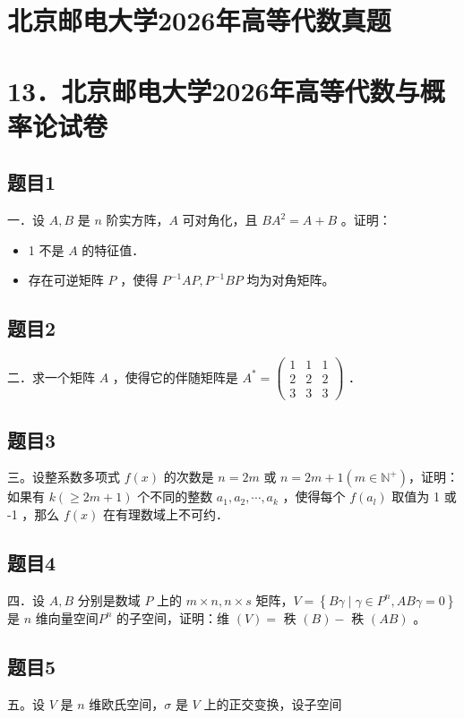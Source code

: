 \documentclass{article}
\begin{document}
\section*{北京邮电大学2026年高等代数真题}
\section*{13．北京邮电大学2026年高等代数与概率论试卷}

\subsection{题目1}
一．设 \(A, B\) 是 \(n\) 阶实方阵，\(A\) 可对角化，且 \(B A^{2}=A+B\) 。证明：

\begin{itemize}
  \item[（1）] 1 不是 \(A\) 的特征值．
  \item[（2）] 存在可逆矩阵 \(P\) ，使得 \(P^{-1} A P, P^{-1} B P\) 均为对角矩阵。
\end{itemize}

\subsection{题目2}
二．求一个矩阵 \(A\) ，使得它的伴随矩阵是 \(A^{*}=\left(\begin{array}{lll}1 & 1 & 1 \\ 2 & 2 & 2 \\ 3 & 3 & 3\end{array}\right)\) ．

\subsection{题目3}
三。设整系数多项式 \(f(x)\) 的次数是 \(n=2 m\) 或 \(n=2 m+1\left(m \in \mathbb{N}^{+}\right)\)，证明：如果有 \(k(\geq 2 m+1)\) 个不同的整数 \(a_{1}, a_{2}, \cdots, a_{k}\) ，使得每个 \(f\left(a_{l}\right)\) 取值为 1 或 -1 ，那么 \(f(x)\) 在有理数域上不可约．

\subsection{题目4}
四．设 \(A, B\) 分别是数域 \(P\) 上的 \(m \times n, n \times s\) 矩阵，\(V=\left\{B \gamma \mid \gamma \in P^{n}, A B \gamma=0\right\}\) 是 \(n\) 维向量空间\(P^{n}\) 的子空间，证明：维 \((V)=\) 秩 \((B)-\) 秩 \((A B)\) 。

\subsection{题目5}
五。设 \(V\) 是 \(n\) 维欧氏空间，\(\sigma\) 是 \(V\) 上的正交变换，设子空间
\end{document}

